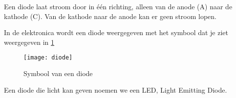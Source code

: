 Een diode laat stroom door in \'e\'en richting, alleen van de anode (A) naar de kathode (C). Van de kathode naar de anode kan er geen stroom lopen.

In de elektronica wordt een diode weergegeven met het symbool dat je ziet weergegeven in \ref{symbool:diode}

\begin{figure}[h]
\texttt{[image: diode]}
\centering
\caption{Symbool van een diode}
\label{symbool:diode}
\end{figure}

Een diode die licht kan geven noemen we een LED, Light Emitting Diode.
